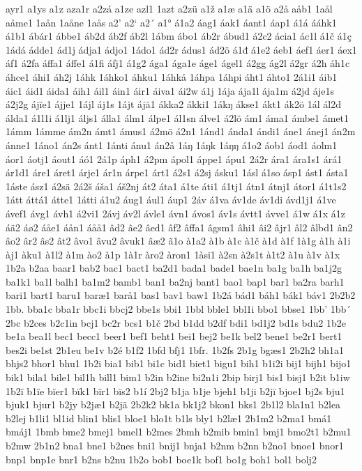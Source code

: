 ayr1
a1ys
a1z
aza1r
a2zá
a1ze
azl1
1azt
a2zü
a1ž
a1æ
a1ä
a1ö
a2å
aåb1
1aål
aåme1
1aån
1aåne
1aås
a2'
a2`
a2´
a1°
á1a2
áag1
áak1
áant1
áap1
á1á
ááhk1
á1b1
ábár1
ábbe1
áb2d
áb2f
áb2l
1ábm
ábo1
áb2r
ábud1
á2c2
ácia1
ác1l
á1č
á1ç
1ádá
ádde1
ád1j
ádja1
ádjo1
1ádo1
ád2r
ádus1
ád2ö
á1đ
á1e2
áeb1
áef1
áer1
áex1
áf1
á2fa
áffa1
áffe1
á1fi
áfj1
á1g2
ága1
ága1e
áge1
ágel1
á2gg
ág2l
á2gr
á2h
áh1c
áhce1
áhi1
áh2j
1áhk
1áhko1
áhku1
1áhkå
1áhpa
1áhpi
áht1
áhto1
2á1i1
áib1
áic1
áid1
áida1
áih1
áil1
áin1
áir1
áiva1
ái2w
á1j
1ája
ája1l
ája1m
á2jd
áje1s
á2j2g
ájïe1
ájje1
1ájl
áj1s
1ájt
ájä1
ákka2
ákki1
1ákŋ
ákse1
ákt1
ák2ö
1ál
ál2d
álda1
á1l1i
á1lj1
áljs1
álla1
álm1
álpe1
ál1sn
álve1
á2lö
ám1
áma1
ámbe1
ámet1
1ámm
1ámme
ám2n
ámt1
ámus1
á2mö
á2n1
1ánd1
ánda1
ándi1
áne1
ánej1
án2m
ánne1
1áno1
án2s
ánt1
1ánti
ánu1
án2å
1áŋ
1áŋk
1áŋŋ
á1o2
áob1
áod1
áolm1
áor1
áotj1
áout1
áó1
2á1p
áph1
á2pm
ápol1
áppe1
ápu1
2á2r
ára1
ára1s1
árá1
ár1d1
áre1
áret1
árje1
ár1n
árpe1
árt1
á2s1
á2sj
ásku1
1ásl
á1so
ásp1
ást1
ásta1
1áste
ász1
á2sä
2á2š
áša1
áš2nj
át2
áta1
á1te
áti1
á1tj1
átn1
átnj1
átor1
á1t1s2
1átt
áttá1
átte1
1átti
á1u2
áug1
ául1
áup1
2áv
á1va
áv1de
áv1di
ávd1j1
á1ve
ávef1
ávg1
ávh1
á2vi1
2ávj
áv2l
ávle1
ávn1
ávos1
áv1s
ávtt1
ávve1
á1w
á1x
á1z
áä2
áø2
áåe1
áån1
áåå1
âd2
âe2
âed1
âf2
âffa1
âgsm1
âhi1
âi2
âjr1
âl2
âlbd1
ân2
âo2
âr2
âs2
ât2
âvo1
âvu2
âvuk1
âæ2
ã1o
à1a2
à1b
à1c
à1č
à1d
à1f
1à1g
à1h
à1i
àj1
àku1
à1l2
à1m
ào2
à1p
1à1r
àro2
àron1
1àsi1
à2sn
à2s1t
à1t2
à1u
à1v
à1x
1b2a
b2aa
baar1
bab2
bac1
bact1
ba2d1
bada1
bade1
bae1n
ba1g
ba1h
ba1j2g
ba1k1
ba1l
balh1
ba1m2
bamb1
ban1
ba2nj
bant1
bao1
bap1
bar1
ba2ra
barh1
bari1
bart1
baru1
baræ1
barå1
bas1
bav1
baw1
1b2á
bád1
báh1
bák1
báv1
2b2b2
1bb.
bba1c
bba1r
bbc1i
bbcj2
bbe1s
bbi1
1bbl
bble1
bbl1i
bbo1
bbse1
1bb'
1bb´
2bc
b2ces
b2c1in
bcj1
bc2r
bcs1
b1č
2bd
b1dd
b2df
bdi1
bd1j2
bd1s
bdu2
1b2e
be1a
bea1l
bec1
becc1
beer1
bef1
beht1
bei1
bej2
be1k
bel2
bene1
be2r1
bert1
bes2i
be1st
2b1eu
be1v
b2é
b1f2
1bfd
bfj1
1bfr.
1b2fs
2b1g
bgæs1
2b2h2
bh1a1
bhjs2
bhor1
bhu1
1b2i
bia1
bib1
bi1c
bid1
biet1
bigu1
bih1
b1i2i
bij1
bijh1
bijo1
bik1
bila1
bile1
bil1h
bill1
bim1
b2in
b2ine
bi2n1i
2bip
birj1
bis1
bisj1
b2it
b1iw
1b2ï
b1ïe
bïer1
bïk1
bïr1
bïs2
b1í
2bj2
b1ja
b1je
bjeh1
b1ji
b2jï
bjoe1
bj2s
bju1
bjuk1
bjur1
b2jy
b2jæ1
b2jä
2b2k2
bk1a
bk1j2
bkon1
bks1
2b1l2
bla1n1
b2lea
b2lej
b1li1
bl1id
blin1
blis1
bloe1
blo1t
b1ls
bly1
b2læ1
2b1m2
b2ma1
bmá1
bmáj1
1bmb
bme2
bmej1
bmel1
b2mes
2bmh
b2mib
bmin1
bmj1
bmo2t1
b2mu1
b2mw
2b1n2
bna1
bne1
b2nes
bni1
bnij1
bnja1
b2nm
b2nn
b2no1
bnoe1
bnor1
bnp1
bnp1e
bnr1
b2ns
b2nu
1b2o
bob1
boe1k
bof1
bo1g
boh1
bol1
bolj2
